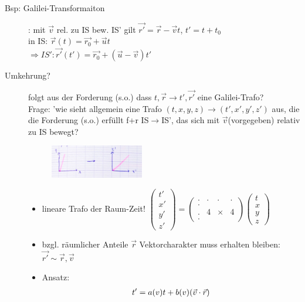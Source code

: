 \begin{description}
\item[Bsp: Galilei-Transformaiton]: mit $\vec{v}$ rel. zu IS bew. IS' gilt $\vec{r'}=\vec{r}-\vec{v}t$, $t'=t+t_0$\\
in IS: $\vec{r}(t)=\vec{r_0}+\vec{u}t$\\
$\Rightarrow IS': \vec{r'}(t')=\vec{r_0}+(\vec{u}-\vec{v})t'$\\
\item[Umkehrung?] folgt aus der Forderung (s.o.) dass $t,\vec{r}\rightarrow t',\vec{r'}$ eine Galilei-Trafo?\\
Frage: 'wie sieht allgemein eine Trafo $(t,x,y,z)\rightarrow(t',x',y',z')$ aus, die die Forderung (s.o.) erfüllt f+r IS$\rightarrow$IS', das sich mit $\vec{v}$(vorgegeben) relativ zu IS bewegt?
\begin{figure}[h]
\begin{center}
\includegraphics[width=0.4\textwidth]{Skizzen/Anhang4.jpg}
\end{center}
\caption{}
\end{figure}
\begin{itemize}
\item lineare Trafo der Raum-Zeit! $\begin{pmatrix}
t'\\
x'\\
y'\\
z'
\end{pmatrix}
=\begin{pmatrix}
. & . & . & . \\
.\\
. & 4 & \times & 4\\
.
\end{pmatrix}
\begin{pmatrix}
t\\
x\\
y\\
z
\end{pmatrix}
$
\item bzgl. räumlicher Anteile $\vec{r}$ Vektorcharakter muss erhalten bleiben: $\vec{r'}\sim\vec{r},\vec{v}$
\item Ansatz:
\begin{align*}
t'=a	(v)			t+b(v) 			(\vec{v}\D \vec{r})\\

\end{align*}
\end{itemize}
\end{description}
